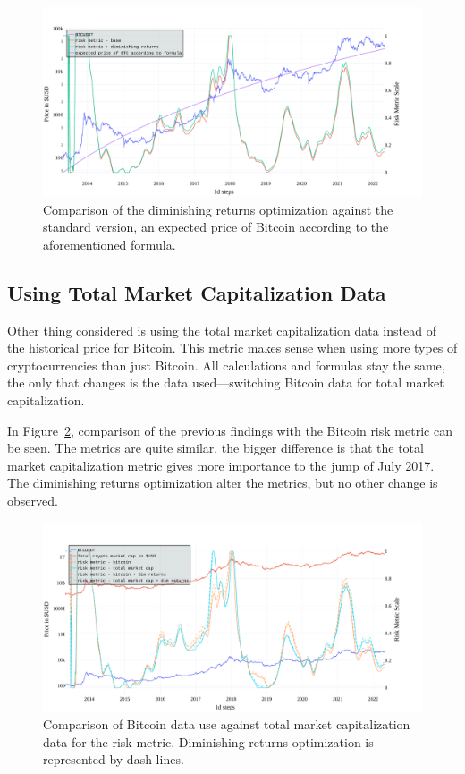 \begin{figure}[!hbt]
    \centering
    \includegraphics[width=\columnwidth]{figures/riskmetric-dim-returns.pdf}
    \caption{Comparison of the diminishing returns optimization against the standard version, an expected price of Bitcoin according to the aforementioned formula.}
    \label{figure-dim-riskmetric}
\end{figure}

\subsection*{Using Total Market Capitalization Data}
\label{subsection-marketcap}
Other thing considered is using the total market capitalization data instead of the historical price for Bitcoin. This metric makes sense when using more types of cryptocurrencies than just Bitcoin. All calculations and formulas stay the same, the only that changes is the data used---switching Bitcoin data for total market capitalization.

In Figure~\ref{figure-total-marketcap-riskmetric}, comparison of the previous findings with the Bitcoin risk metric can be seen. The metrics are quite similar, the bigger difference is that the total market capitalization metric gives more importance to the jump of July 2017. The diminishing returns optimization alter the metrics, but no other change is observed.

\begin{figure}[!hbt]
    \centering
    \includegraphics[width=\columnwidth]{figures/totalmarketcap-metric.pdf}
    \caption{Comparison of Bitcoin data use against total market capitalization data for the risk metric. Diminishing returns optimization is represented by dash lines.}
    \label{figure-total-marketcap-riskmetric}
\end{figure}


